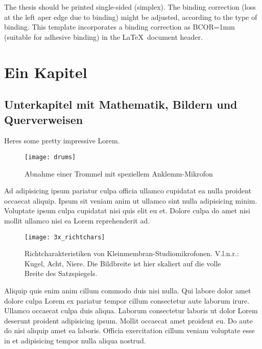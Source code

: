 The thesis should be printed single-sided (simplex). The binding correction (loss at the left aper edge due to binding) might be adjusted, according to the type of binding. This template incorporates a binding correction as BCOR=1mm (suitable for adhesive binding) in the \LaTeX\ document header.


\chapter{Ein Kapitel}

\section{Unterkapitel mit Mathematik, Bildern und Querverweisen}

Heres some pretty impressive Lorem.

\begin{figure}[htp]     %
\centering
\texttt{[image: drums]} 
\caption{Abnahme einer Trommel mit speziellem Anklemm-Mikrofon}\label{trommelmik}
\end{figure}

Ad adipisicing ipsum pariatur culpa officia ullamco cupidatat ea nulla proident occaecat aliquip. Ipsum sit veniam anim ut ullamco sint nulla adipisicing minim. Voluptate ipsum culpa cupidatat nisi quis elit eu et. Dolore culpa do amet nisi mollit ullamco nisi ea Lorem reprehenderit ad.

\begin{figure}[htp]     %
\centering
\texttt{[image: 3x\_richtchars]}
\caption[Richtcharakteristiken von Kleinmembran-Studiomikrofonen]{Richtcharakteristiken von Kleinmembran-Studiomikrofonen. V.l.n.r.: Kugel, Acht, Niere. Die Bildbreite ist hier skaliert auf die volle Breite des Satzspiegels.}\label{richtch}
\end{figure}

Aliquip quis enim anim cillum commodo duis nisi nulla. Qui labore dolor amet dolore culpa Lorem ex pariatur tempor cillum consectetur aute laborum irure. Ullamco occaecat culpa duis aliqua. Laborum consectetur laboris ut dolor Lorem deserunt proident adipisicing ipsum. Mollit occaecat amet proident eu. Do aute do nisi aliquip amet ea laboris. Officia exercitation cillum veniam voluptate esse in et adipisicing tempor nulla aliqua nostrud.

